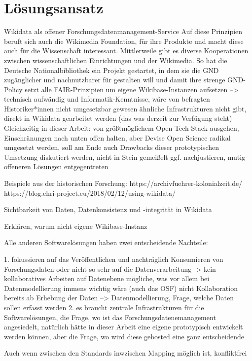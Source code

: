\onehalfspacing

\section{Lösungsansatz}
Wikidata als offener Forschungsdatenmanagement-Service
Auf diese Prinzipien beruft sich auch die Wikimedia Foundation, für ihre Produkte und macht diese auch für die Wissenschaft interessant. Mittlerweile gibt es diverse Kooperationen zwischen wissenschaftlichen Einrichtungen und der Wikimedia. So hat die Deutsche Nationalbibliothek ein Projekt gestartet, in dem sie die GND zugänglicher und nachnutzbarer für gestalten will und damit ihre strenge GND-Policy
setzt alle FAIR-Prinzipien um
eigene Wikibase-Instanzen aufsetzen --> technisch aufwändig und Informatik-Kenntnisse, wäre von befragten Historiker*innen nicht umgesetzbar gewesen
ähnliche Infrastrukturen nicht gibt, direkt in Wikidata gearbeitet werden (das was derzeit zur Verfügung steht)
Gleichzeitig in dieser Arbeit: von größtmöglichem Open Tech Stack ausgehen, Einschränungen nach unten offen halten, aber Devise Open Science radikal umgesetzt werden, soll am Ende auch Drawbacks dieser prototypischen Umsetzung diskutiert werden, nicht in Stein gemeißelt ggf. nachjustieren, mutig offeneren Lösungen entgegentreten

Beispiele aus der historischen Forschung:
https://archivfuehrer-kolonialzeit.de/
https://blog.ehri-project.eu/2018/02/12/using-wikidata/


Sichtbarkeit von Daten, Datenkonsistenz und -integrität in Wikidata

Erklären, warum nicht eigene Wikibase-Instanz

Alle anderen Softwarelösungen haben zwei entscheidende Nachteile:

1. fokussieren auf das Veröffentlichen und nachträglich Konsumieren von Forschungsdaten oder nicht so sehr auf die Datenverarbeitung -> kein kollaboratives Arbeiten auf Datenebene mögliche, was vor allem bei Datenmodellierung immens wichtig wäre (auch das OSF) nicht
Kollaboration bereits ab Erhebung der Daten --> Datenmodellierung, Frage, welche Daten sollen erfasst werden
2. es braucht zentrale Infrastrukturen für die Softwarelösungen, die Frage, wo ist das Forschungsdatenemanagement angesiedelt, natürlich hätte in dieser Arbeit eine eigene prototypisch entwickelt werden können, aber die Frage, wo wird diese gehosted eine ganz entscheidende

Auch wenn zwischen den Standards inwzischen Mapping möglich ist, konfliktfrei

